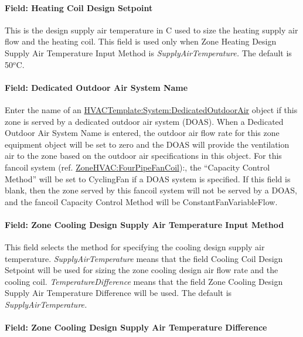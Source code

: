 \paragraph{Field: Heating Coil Design Setpoint}\label{field-heating-coil-design-setpoint}

This is the design supply air temperature in C used to size the heating supply air flow and the heating coil. This field is used only when Zone Heating Design Supply Air Temperature Input Method is \emph{SupplyAirTemperature.} The default is 50\(^{o}\)C.

\paragraph{Field: Dedicated Outdoor Air System Name}\label{field-dedicated-outdoor-air-system-name-1}

Enter the name of an \hyperref[hvactemplatesystemdedicatedoutdoorair]{HVACTemplate:System:DedicatedOutdoorAir} object if this zone is served by a dedicated outdoor air system (DOAS). When a Dedicated Outdoor Air System Name is entered, the outdoor air flow rate for this zone equipment object will be set to zero and the DOAS will provide the ventilation air to the zone based on the outdoor air specifications in this object. For this fancoil system (ref. \hyperref[zonehvacfourpipefancoil]{ZoneHVAC:FourPipeFanCoil}):, the ``Capacity Control Method'' will be set to CyclingFan if a DOAS system is specified. If this field is blank, then the zone served by this fancoil system will not be served by a DOAS, and the fancoil Capacity Control Method will be ConstantFanVariableFlow.

\paragraph{Field: Zone Cooling Design Supply Air Temperature Input Method}\label{field-zone-cooling-design-supply-air-temperature-input-method-000}

This field selects the method for specifying the cooling design supply air temperature. \emph{SupplyAirTemperature} means that the field Cooling Coil Design Setpoint will be used for sizing the zone cooling design air flow rate and the cooling coil. \emph{TemperatureDifference} means that the field Zone Cooling Design Supply Air Temperature Difference will be used. The default is \emph{SupplyAirTemperature.}

\paragraph{Field: Zone Cooling Design Supply Air Temperature Difference}\label{field-zone-cooling-design-supply-air-temperature-difference-000}

